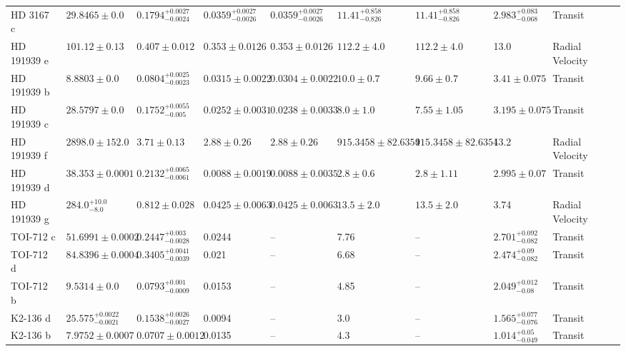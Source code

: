\begin{tabular}{llllllllll}
HD 3167 c & $29.8465 \pm 0.0$ & $0.1794^{+0.0027}_{-0.0024}$ & $0.0359^{+0.0027}_{-0.0026}$ & $0.0359^{+0.0027}_{-0.0026}$ & $11.41^{+0.858}_{-0.826}$ & $11.41^{+0.858}_{-0.826}$ & $2.983^{+0.083}_{-0.068}$ & Transit & \cite{COY_ET_AL_2026} \\
HD 191939 e & $101.12 \pm 0.13$ & $0.407 \pm 0.012$ & $0.353 \pm 0.0126$ & $0.353 \pm 0.0126$ & $112.2 \pm 4.0$ & $112.2 \pm 4.0$ & 13.0 & Radial Velocity & \cite{ORELL_MIQUEL_ET_AL_2023} \\
HD 191939 b & $8.8803 \pm 0.0$ & $0.0804^{+0.0025}_{-0.0023}$ & $0.0315 \pm 0.0022$ & $0.0304 \pm 0.0022$ & $10.0 \pm 0.7$ & $9.66 \pm 0.7$ & $3.41 \pm 0.075$ & Transit & \cite{ORELL_MIQUEL_ET_AL_2023} \\
HD 191939 c & $28.5797 \pm 0.0$ & $0.1752^{+0.0055}_{-0.005}$ & $0.0252 \pm 0.0031$ & $0.0238 \pm 0.0033$ & $8.0 \pm 1.0$ & $7.55 \pm 1.05$ & $3.195 \pm 0.075$ & Transit & \cite{ORELL_MIQUEL_ET_AL_2023} \\
HD 191939 f & $2898.0 \pm 152.0$ & $3.71 \pm 0.13$ & $2.88 \pm 0.26$ & $2.88 \pm 0.26$ & $915.3458 \pm 82.6354$ & $915.3458 \pm 82.6354$ & 13.2 & Radial Velocity & \cite{LUBIN_ET_AL__2024} \\
HD 191939 d & $38.353 \pm 0.0001$ & $0.2132^{+0.0065}_{-0.0061}$ & $0.0088 \pm 0.0019$ & $0.0088 \pm 0.0035$ & $2.8 \pm 0.6$ & $2.8 \pm 1.11$ & $2.995 \pm 0.07$ & Transit & \cite{ORELL_MIQUEL_ET_AL_2023} \\
HD 191939 g & $284.0^{+10.0}_{-8.0}$ & $0.812 \pm 0.028$ & $0.0425 \pm 0.0063$ & $0.0425 \pm 0.0063$ & $13.5 \pm 2.0$ & $13.5 \pm 2.0$ & 3.74 & Radial Velocity & \cite{ORELL_MIQUEL_ET_AL_2023} \\
TOI-712 c & $51.6991 \pm 0.0002$ & $0.2447^{+0.003}_{-0.0028}$ & 0.0244 & -- & 7.76 & -- & $2.701^{+0.092}_{-0.082}$ & Transit & \cite{VACH_ET_AL__2022} \\
TOI-712 d & $84.8396 \pm 0.0004$ & $0.3405^{+0.0041}_{-0.0039}$ & 0.021 & -- & 6.68 & -- & $2.474^{+0.09}_{-0.082}$ & Transit & \cite{VACH_ET_AL__2022} \\
TOI-712 b & $9.5314 \pm 0.0$ & $0.0793^{+0.001}_{-0.0009}$ & 0.0153 & -- & 4.85 & -- & $2.049^{+0.012}_{-0.08}$ & Transit & \cite{VACH_ET_AL__2022} \\
K2-136 d & $25.575^{+0.0022}_{-0.0021}$ & $0.1538^{+0.0026}_{-0.0027}$ & 0.0094 & -- & 3.0 & -- & $1.565^{+0.077}_{-0.076}$ & Transit & \cite{MAYO_ET_AL_2023} \\
K2-136 b & $7.9752 \pm 0.0007$ & $0.0707 \pm 0.0012$ & 0.0135 & -- & 4.3 & -- & $1.014^{+0.05}_{-0.049}$ & Transit & \cite{MAYO_ET_AL_2023} \\

\end{tabular}
